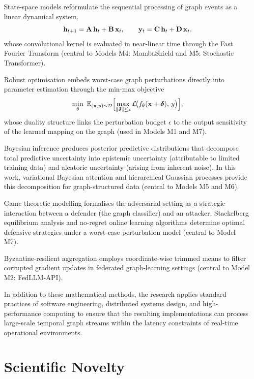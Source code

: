 State-space models reformulate the sequential processing of graph events as a linear dynamical system,\begin{equation}
\mathbf{h}_{t+1} = \mathbf{A}\,\mathbf{h}_t + \mathbf{B}\,\mathbf{x}_t, \qquad
\mathbf{y}_t = \mathbf{C}\,\mathbf{h}_t + \mathbf{D}\,\mathbf{x}_t,
\label{eq:ssm}
\end{equation}whose convolutional kernel is evaluated in near-linear time through the Fast Fourier Transform (central to Models M4: MambaShield and M5: Stochastic Transformer).

Robust optimisation embeds worst-case graph perturbations directly into parameter estimation through the min-max objective\begin{equation}
\min_\theta\;
\mathbb{E}_{(\mathbf{x},y)\sim\mathcal{D}}
\Bigl[
  \max_{\|\boldsymbol{\delta}\|\le\epsilon}
    \mathcal{L}\!\bigl(f_\theta(\mathbf{x}+\boldsymbol{\delta}),\,y\bigr)
\Bigr],
\label{eq:robust_opt}
\end{equation}
whose duality structure links the perturbation budget $\epsilon$ to the output sensitivity of the learned mapping on the graph (used in Models M1 and M7).

Bayesian inference produces posterior predictive distributions that decompose total predictive uncertainty into epistemic uncertainty (attributable to limited training data) and aleatoric uncertainty (arising from inherent noise). In this work, variational Bayesian attention and hierarchical Gaussian processes provide this decomposition for graph-structured data (central to Models M5 and M6).

Game-theoretic modelling formalises the adversarial setting as a strategic interaction between a defender (the graph classifier) and an attacker. Stackelberg equilibrium analysis and no-regret online learning algorithms determine optimal defensive strategies under a worst-case perturbation model (central to Model M7).

Byzantine-resilient aggregation employs coordinate-wise trimmed means to filter corrupted gradient updates in federated graph-learning settings (central to Model M2: FedLLM-API).

In addition to these mathematical methods, the research applies standard practices of software engineering, distributed systems design, and high-performance computing to ensure that the resulting implementations can process large-scale temporal graph streams within the latency constraints of real-time operational environments.

\section*{Scientific Novelty}

